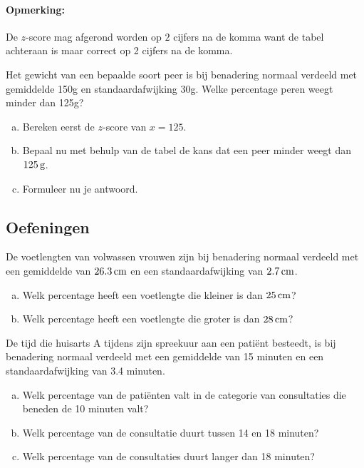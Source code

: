 \documentclass[12pt,twoside]{article}
\begin{document}
{\paragraph*{Opmerking: } De $z$-score mag afgerond worden op $2$ cijfers na de komma want de tabel achteraan is maar correct op 2 cijfers na de komma.

\begin{oefening}
Het gewicht van een bepaalde soort peer is bij benadering normaal verdeeld met gemiddelde 150g en standaardafwijking 30g. 
Welke percentage peren weegt minder dan 125g?
\begin{enumerate}[(a)]
  \item Bereken eerst de $z$-score van $x=125$.
  \item Bepaal nu met behulp van de tabel de kans dat een peer minder weegt dan $125\g$.
  \item Formuleer nu je antwoord.
\end{enumerate}
\end{oefening}

\subsection{Oefeningen}

\begin{oefening}
De voetlengten van volwassen vrouwen zijn bij benadering normaal verdeeld met een gemiddelde van $26.3 \cm$ en een standaardafwijking van $2.7 \cm$.
\begin{enumerate}[(a)]
  \item Welk percentage heeft een voetlengte die kleiner is dan $25 \cm$?
  \item Welk percentage heeft een voetlengte die groter is dan $28 \cm$?
\end{enumerate}
\end{oefening}

\begin{oefening}
De tijd die huisarts A tijdens zijn spreekuur aan een patiënt besteedt, is bij benadering normaal verdeeld met een gemiddelde van 15 minuten en een standaardafwijking van 3.4 minuten.
\begin{enumerate}[(a)]
  \item Welk percentage van de patiënten valt in de categorie van consultaties die beneden de 10 minuten valt?
  \item Welk percentage van de consultatie duurt tussen 14 en 18 minuten?
  \item Welk percentage van de consultaties duurt langer dan 18 minuten?
\end{enumerate}
\end{oefening}

}
\end{document}
